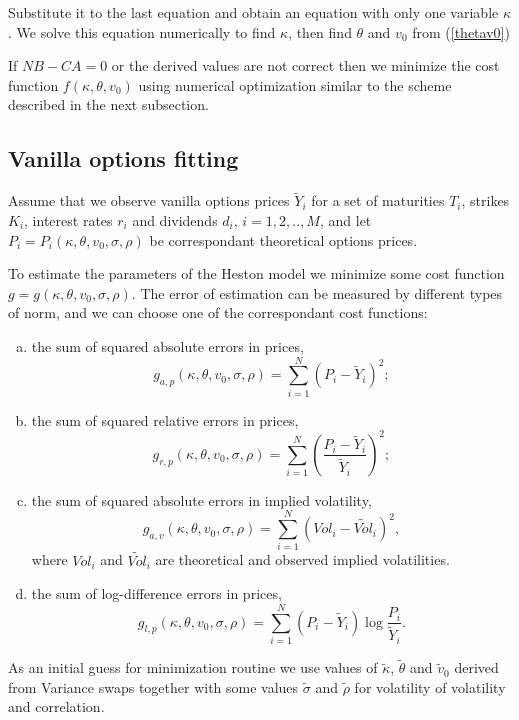 \documentclass[12pt,amsfonts,enumerate,amscd]{amsart}
\numberwithin{table}{section}
\numberwithin{equation}{section}
\newcommand{\eq}[1]{(\ref{#1})}
\begin{document}
Substitute it to the last equation and obtain an equation with only one variable $\kappa$.
We solve this equation numerically to find $\kappa$, then  find $\theta$ and $v_0$ from \eq{thetav0}

If $N B - C A =0$ or the derived values are not correct then we minimize the cost function $f(\kappa, \theta, v_0)$ using numerical optimization similar to the scheme described in the next subsection. 
 

\subsection{Vanilla options fitting}

Assume that we observe vanilla options prices $\tilde{Y}_i$ for a set of maturities $T_i$, strikes $K_i$, interest rates $r_i$ and dividends $d_i$, $i=1, 2, .., M$, and let $P_i=P_i(\kappa, \theta, v_0, \sigma, \rho)$ be correspondant theoretical options prices.

To estimate the parameters of the Heston model we minimize some cost function $g=g(\kappa, \theta, v_0, \sigma, \rho)$. The error of estimation can be measured by different types of norm, and we can choose one of the correspondant cost functions:
\begin{enumerate}[(a)]
 \item the sum of squared absolute errors in prices, 
 \[
g_{a, p}(\kappa, \theta, v_0, \sigma, \rho)=\sum_{i=1}^N \left( P_i - \tilde{Y}_i\right)^2;
 \]

  \item the sum of squared relative errors in prices, 
 \[
g_{r, p}(\kappa, \theta, v_0, \sigma, \rho)=\sum_{i=1}^N \left( \frac{P_i - \tilde{Y}_i}{\tilde{Y}_i}\right)^2;
 \]

  \item the sum of squared absolute errors in implied volatility, 
 \[
g_{a, v}(\kappa, \theta, v_0, \sigma, \rho)=\sum_{i=1}^N \left( Vol_i - \tilde{Vol}_i\right)^2,
 \]
where $Vol_i$ and $\tilde{Vol}_i$ are theoretical and observed implied volatilities.

\item the sum of log-difference errors in prices, 
 \[
g_{l, p}(\kappa, \theta, v_0, \sigma, \rho)=\sum_{i=1}^N ( P_i - \tilde{Y}_i)\log\frac{P_i}{\tilde{Y}_i}.
 \]
\end{enumerate}

As an initial guess for minimization routine we use values of $\tilde{\kappa}$, $\tilde{\theta}$ and $\tilde{v}_0$ derived from Variance swaps together with some values $\tilde{\sigma}$ and $\tilde{\rho}$ for volatility of volatility and correlation. 
\end{document}
